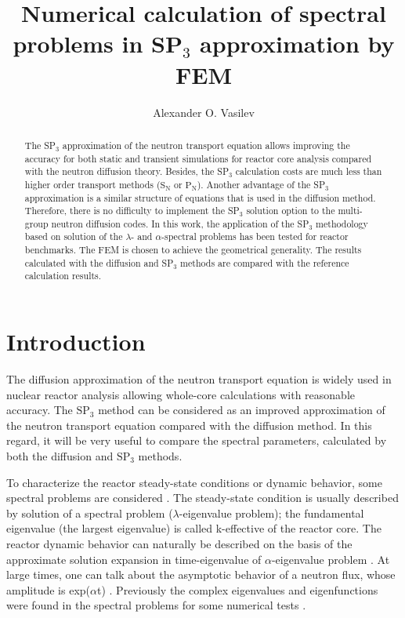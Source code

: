 \documentclass[a4paper]{jpconf}
\begin{document}
\title{Numerical calculation of spectral problems in SP$_3$ approximation by FEM}

\author{Alexander O. Vasilev}

\address{North-Eastern Federal University, 58, Belinskogo, Yakutsk, Russia}


\begin{abstract}
The SP$_3$ approximation of the neutron transport equation allows improving the accuracy for both static and transient simulations for reactor core analysis compared with the neutron diffusion theory. 
Besides, the SP$_3$ calculation costs are much less than higher order transport methods ($\mathrm{S_N}$ or $\mathrm{P_N}$). 
Another advantage of the SP$_3$ approximation is a similar structure of equations that is used in the diffusion method. 
Therefore, there is no difficulty to implement the SP$_3$ solution option to the multi-group neutron diffusion codes. 
In this work, the application of the SP$_3$ methodology based on solution of the $\lambda$- and $\alpha$-spectral problems has been tested for reactor benchmarks. 
The FEM is chosen to achieve the geometrical generality. 
The results calculated with the diffusion and SP$_3$ methods are compared with the reference calculation results.
\end{abstract}

\section{Introduction}
The diffusion approximation of the neutron transport equation is widely used in nuclear reactor analysis allowing whole-core calculations with reasonable accuracy. 
The $\mathrm{SP_3}$ \cite{brantley2000simplified} method can be considered as an improved approximation of the neutron transport equation compared with the diffusion method. 
In this regard, it will be very useful to compare the spectral parameters, calculated by both the diffusion and $\mathrm{SP_3}$ methods. 

To characterize the reactor steady-state conditions or dynamic behavior, some spectral problems are considered \cite{bell1970, stacey2007}. 
The steady-state condition is usually described by solution of a spectral problem ($\lambda$-eigenvalue problem); the fundamental eigenvalue (the largest eigenvalue) is called k-effective of the reactor core. 
The reactor dynamic behavior can naturally be described on the basis of the approximate solution expansion in time-eigenvalue of $\alpha$-eigenvalue problem \cite{bell1970}. 
At large times, one can talk about the asymptotic behavior of a neutron flux, whose amplitude is exp($\alpha$t) \cite{avvakumov2017matmod}. 
Previously the complex eigenvalues and eigenfunctions were found in the spectral problems for some numerical tests \cite{avvakumov2017spectral}.
\end{document}
